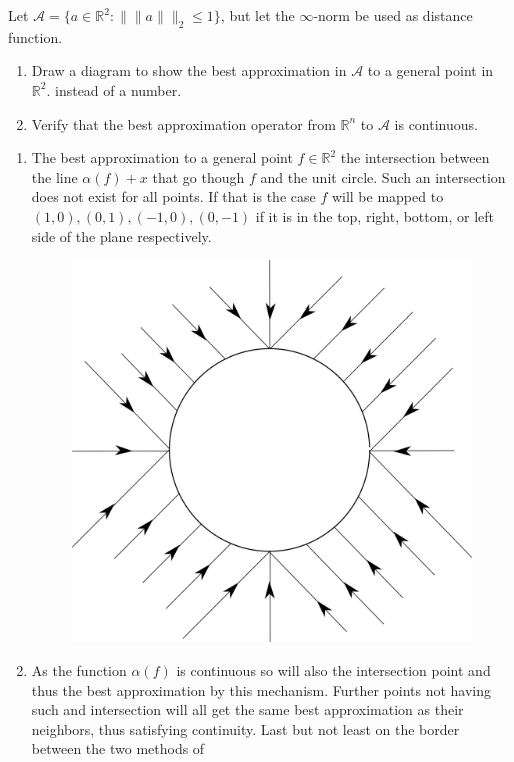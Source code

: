 \begin{problem}
  Let $\mathcal{A} = \{a \in \mathds{R}^2 : \|\|a\|\|_2 \leq1 \}$,
  but let the $\infty$-norm be used as distance function.

\begin{enumerate}
\item Draw a diagram to show the best approximation in $\mathcal{A}$
  to a general point in $\mathds{R}^2$.  instead of a number.
\item Verify that the best approximation operator from $\mathds{R}^n$
  to $\mathcal{A}$ is continuous.
\end{enumerate}

\end{problem}

\begin{solution}
\begin{enumerate}
\item The best approximation to a general point $f \in \mathds{R}^2$
  the intersection between the line $\alpha(f) + x$ that go though $f$
  and the unit circle. Such an intersection does not exist for all
  points. If that is the case $f$ will be mapped to $(1, 0), (0, 1),
  (-1, 0), (0, -1)$ if it is in the top, right, bottom, or left side
  of the plane respectively.
  \begin{figure}[!ht]
  \centering \includegraphics[scale = 0.1]{drawing_task_4.png}
  \label{fig:task_4}
  \end{figure}

\item As the function $\alpha(f)$ is continuous so will also the
  intersection point and thus the best approximation by this
  mechanism. Further points not having such and intersection will all
  get the same best approximation as their neighbors, thus satisfying
  continuity. Last but not least on the border between the two methods
  of
\end{enumerate}
\end{solution}

 	


